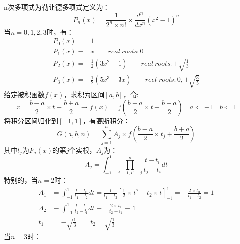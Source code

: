 \documentclass[12pt, onecolumn]{article}
\newcommand\normf{\fangsong}
\begin{document}
	\section{\normf{高斯型求积公式}}
	n次多项式为勒让德多项式定义为：
	\begin{equation}
	P_n(x)=\frac{1}{2^n\times n!}\times \frac{d^n}{dx^n}
	(x^2-1)^n
	\end{equation}
	当$n=0,1,2,3$时，有：
	\begin{equation}
	\begin{aligned}
	P_0(x)=&1
	\\
	P_1(x)=&x
	\qquad real\;roots:0
	\\
	P_2(x)=&\frac{1}{2}(3x^2-1)
	\qquad real\;roots:\pm\sqrt{\frac{1}{3}}
	\\
	P_3(x)=&\frac{1}{2}(5x^3-3x)
	\qquad real\;roots:0,\pm\sqrt{\frac{3}{5}}
	\end{aligned}
	\end{equation}
	给定被积函数$f(x)$，求积为区间$[a,b]$，令:
	\begin{equation}
	x=\frac{b-a}{2}\times t+\frac{b+a}{2}
	\rightarrow
	f(x)=f\left( \frac{b-a}{2}\times t+\frac{b+a}{2}\right) 
	\quad
	a\Leftarrow -1\quad b\Leftarrow 1
	\end{equation}
	将积分区间归化到$[-1,1]$，有高斯积分：
	\begin{equation}
	G(a,b,n)=\sum_{j=1}^{n}A_j\times 
	f\left( 
	\frac{b-a}{2}\times t_j+\frac{b+a}{2}
	\right) 
	\end{equation}
	其中$t_j$为$P_n(x)$的第$j$个实根，$A_j$为：
	\begin{equation}
	A_j=\int_{-1}^{1}\prod_{i=1,i!=j}^{n}\frac{t-t_i}{t_j-t_i}dt
	\end{equation}
	特别的，当$n=2$时：
	\begin{equation}
	\begin{aligned}
	A_1&=\int_{-1}^{1}\frac{t-t_2}{t_1-t_2}dt=\frac{1}{t_1-t_2}\left[
		\frac{1}{2}\times t^2-t_2\times t
		\right]_{-1}^{1}=-\frac{2\times t_2}{t_1-t_2}=1
		\\
		A_2&=\int_{-1}^{1}\frac{t-t_1}{t_2-t_1}dt=-\frac{2\times t_1}{t_2-t_1}=1
		\\
		t_1&=-\sqrt{\frac{1}{3}}\qquad t_2=\sqrt{\frac{1}{3}}
	\end{aligned}
	\end{equation}
	当$n=3$时：
\end{document}
